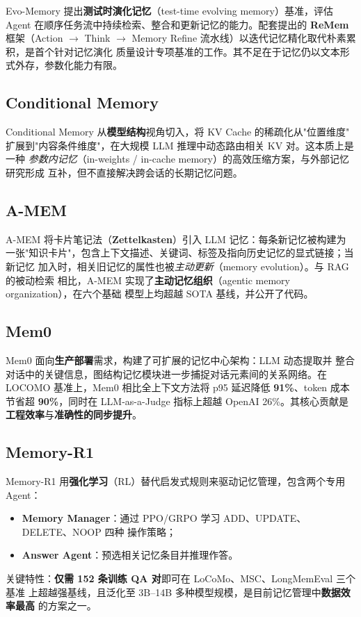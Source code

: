 \documentclass[11pt,a4paper]{article}
\begin{document}
Evo-Memory 提出\textbf{测试时演化记忆}（test-time evolving memory）基准，评估 Agent
在顺序任务流中持续检索、整合和更新记忆的能力。配套提出的 \textbf{ReMem} 框架（Action
$\to$ Think $\to$ Memory Refine 流水线）以迭代记忆精化取代朴素累积，是首个针对记忆演化
质量设计专项基准的工作。其不足在于记忆仍以文本形式外存，参数化能力有限。

\subsection{Conditional Memory}

Conditional Memory 从\textbf{模型结构}视角切入，将 KV Cache 的稀疏化从"位置维度"
扩展到"内容条件维度"，在大规模 LLM 推理中动态路由相关 KV 对。这本质上是一种
\emph{参数内记忆}（in-weights / in-cache memory）的高效压缩方案，与外部记忆研究形成
互补，但不直接解决跨会话的长期记忆问题。

\subsection{A-MEM}

A-MEM 将卡片笔记法（\textbf{Zettelkasten}）引入 LLM 记忆：每条新记忆被构建为
一张"知识卡片"，包含上下文描述、关键词、标签及指向历史记忆的显式链接；当新记忆
加入时，相关旧记忆的属性也被\emph{主动更新}（memory evolution）。与 RAG 的被动检索
相比，A-MEM 实现了\textbf{主动记忆组织}（agentic memory organization），在六个基础
模型上均超越 SOTA 基线，并公开了代码。

\subsection{Mem0}

Mem0 面向\textbf{生产部署}需求，构建了可扩展的记忆中心架构：LLM 动态提取并
整合对话中的关键信息，图结构记忆模块进一步捕捉对话元素间的关系网络。在 LOCOMO
基准上，Mem0 相比全上下文方法将 p95 延迟降低 \textbf{91\%}、token 成本节省超
\textbf{90\%}，同时在 LLM-as-a-Judge 指标上超越 OpenAI 26\%。其核心贡献是
\textbf{工程效率}与\textbf{准确性的同步提升}。

\subsection{Memory-R1}

Memory-R1 用\textbf{强化学习}（RL）替代启发式规则来驱动记忆管理，包含两个专用
Agent：
\begin{itemize}
  \item \textbf{Memory Manager}：通过 PPO/GRPO 学习 ADD、UPDATE、DELETE、NOOP 四种
    操作策略；
  \item \textbf{Answer Agent}：预选相关记忆条目并推理作答。
\end{itemize}
关键特性：\textbf{仅需 152 条训练 QA 对}即可在 LoCoMo、MSC、LongMemEval 三个基准
上超越强基线，且泛化至 3B--14B 多种模型规模，是目前记忆管理中\textbf{数据效率最高}
的方案之一。
\end{document}
